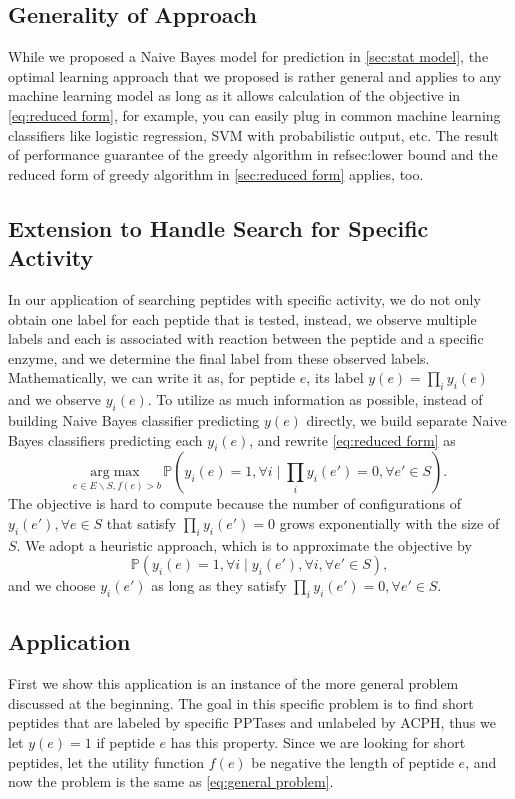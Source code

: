 \documentclass[11pt]{article}
\newcommand{\Prob}{\mathbb{P}}
\begin{document}
\subsection{Generality of Approach} \label{sec:generality}
While we proposed a Naive Bayes model for prediction in \ref{sec:stat model}, the optimal learning approach that we proposed is rather general and applies to any machine learning model as long as it allows calculation of the objective in \eqref{eq:reduced form}, for example, you can easily plug in common machine learning classifiers like logistic regression, SVM with probabilistic output, etc. The result of performance guarantee of the greedy algorithm in ref{sec:lower bound} and the
reduced form of greedy algorithm in \ref{sec:reduced form} applies, too.

\subsection{Extension to Handle Search for Specific Activity} \label{sec:extension}
In our application of searching peptides with specific activity, we do not only obtain one label for each peptide that is tested, instead, we observe multiple labels and each is associated with reaction between the peptide and a specific enzyme, and we determine the final label from these observed labels. Mathematically, we can write it as, for peptide $e$, its label $y(e) = \prod_i y_i(e)$ and we observe $y_i(e)$. To utilize as much information as possible, instead of building Naive Bayes
classifier predicting $y(e)$ directly, we build separate Naive Bayes classifiers predicting each $y_i(e)$, and rewrite \eqref{eq:reduced form} as
\begin{equation*}
  \underset{e \in E \backslash S, f(e) > b}{\mathrm{arg}\max} \, \Prob (y_i(e)=1, \forall i \mid \prod_i y_i(e') = 0, \forall e' \in S).
  \label{}
\end{equation*}
The objective is hard to compute because the number of configurations of $y_i(e'), \forall e \in S$ that satisfy $\prod_i y_i(e') = 0$ grows exponentially with the size of $S$. We adopt a heuristic approach, which is to approximate the objective by
\begin{equation}
  \Prob (y_i(e)=1, \forall i \mid y_i(e'), \forall i, \forall e' \in S),
  \label{}
\end{equation}
and we choose $y_i(e')$ as long as they satisfy $\prod_i y_i(e') = 0, \forall e' \in S$.

\subsection{Application} \label{sec:application}
First we show this application is an instance of the more general problem discussed
at the beginning. The goal in this specific problem is to find short peptides that 
are labeled by specific PPTases and unlabeled by ACPH, thus we let $y(e) = 1$
if peptide $e$ has this property. Since we are looking for short peptides, let the
utility function $f(e)$ be negative the length of peptide $e$, and now the problem
is the same as \eqref{eq:general problem}.
\end{document}
